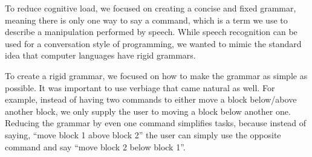 \documentclass[]{article}
\begin{document}

To reduce cognitive load, we focused on creating a concise and fixed grammar, 
meaning there is only one way to say a command, which is a term we use to 
describe a manipulation performed by speech. While speech recognition can be 
used for a conversation style of programming, we wanted to mimic the standard 
idea that computer languages have rigid grammars. 

To create a rigid grammar, we focused on how to make the grammar as simple as possible. 
It was important to use verbiage that came natural as well. For example, instead of having two 
commands to either move a block below/above another block, we only supply the user to 
moving a block below another one. Reducing the grammar by even one command simplifies 
tasks, because instead of saying, ``move block 1 above block 2'' the user can simply use the 
opposite command and say ``move block 2 below block 1''.

\end{document}
